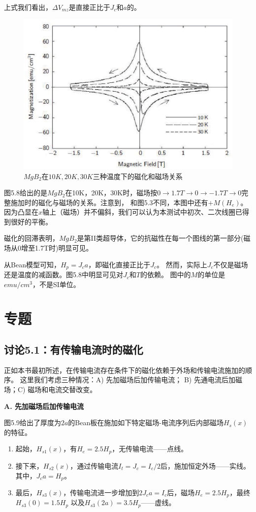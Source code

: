 上式我们看出，$\Delta V_{mz}$是直接正比于$J_c$和$a$的。
\begin{figure}[htbp]
  \centering
 \includegraphics[scale=0.7]{chpt5/figs/fig5.8.eps}
  \caption{$MgB_2$在$10K,20K,30K$三种温度下的磁化和磁场关系}\label{fig:magvfield}
\end{figure}

图5.8给出的是$MgB_2$在10K，20K，30K时，磁场按$0\rightarrow 1.7T\rightarrow 0 \rightarrow -1.7T\rightarrow 0$完整施加时的磁化与磁场的关系。注意到，
和图5.3不同，本图中还有$+M(H_e)$。因为凸显在$x$轴上（磁场）并不偏斜，我们可以认为本测试中初次、二次线圈已得到很好的平衡。

磁化的回滞表明，$MgB_2$是第II类超导体，它的抗磁性在每一个图线的第一部分(磁场从0增至1.7T时)明显可见。

从Bean模型可知，$H_p=J_c a$，即磁化直接正比于$J_c$。
然而，实际上$J_c$不仅是磁场还是温度的减函数。图5.8中明显可见对$J_c$和$T$的依赖。
图中的$M$的单位是$emu/cm^3$，不是SI单位。

\section{专题}
\subsection{讨论5.1：有传输电流时的磁化}
正如本书最初所述，在传输电流存在条件下的磁化依赖于外场和传输电流施加的顺序。
这里我们考虑三种情况：A) 先加磁场后加传输电流； B) 先通电流后加磁场；C) 磁场和电流交替改变。

\textbf{A.  先加磁场后加传输电流}

图5.9给出了厚度为$2a$的Bean板在施加如下特定磁场-电流序列后内部磁场$H_s(x)$的特征。
\begin{enumerate}
	\item 起始，$H_{s1}(x)$，有$H_e=2.5H_p$，无传输电流——点线。
	\item 接下来，$H_{s2}(x)$，通过传输电流$I_t=J_c=I_c/2$后，施加恒定外场——实线。其中，$J_c a=H_p$。
	\item 最后，$H_{s3}(x)$，传输电流进一步增加到$2J_c a=I_c$后，磁场$H_e =2.5 H_p$，最终$H_{s3}(0)=1.5 H_p$
	以及$H_{s3}(2a)=3.5H_p$——虚线。
\end{enumerate}

